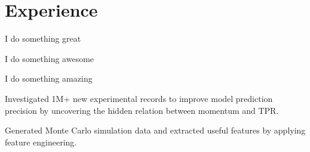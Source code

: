 \documentclass[letterpaper]{deedy-resume-openfont}
\begin{document}

\section{Experience}

\begin{tightemize}
\item I do something great
\item I do something awesome
\item I do something amazing
\end{tightemize}
\sectionsep

\begin{tightemize}
\item Investigated 1M+ new experimental records to improve model prediction precision by uncovering the hidden relation between momentum and TPR.
\item Generated Monte Carlo simulation data and extracted useful features by applying feature engineering.
\end{tightemize}
\sectionsep
\end{document}
